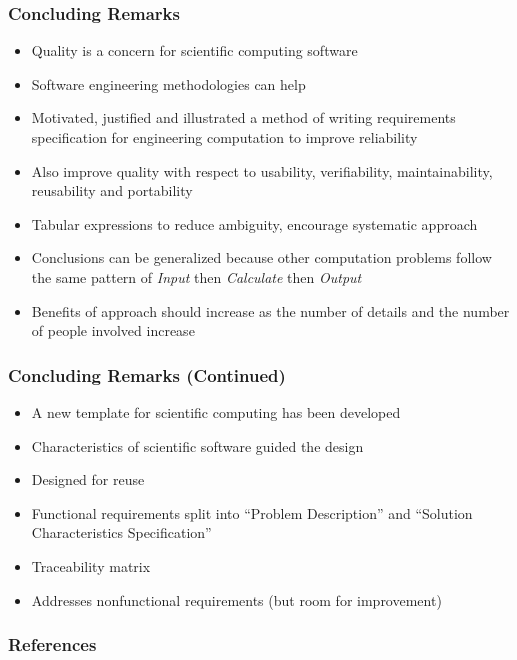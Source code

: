 \documentclass[t,12pt,numbers,fleqn]{beamer}
\begin{document}
\begin{frame}
\frametitle{Concluding Remarks}
\begin{itemize}
\item Quality is a concern for scientific computing software
\item Software engineering methodologies can help
\item Motivated, justified and illustrated a method of writing requirements specification for engineering computation
to improve reliability
\item Also improve quality with respect to usability, verifiability, maintainability, reusability and portability
\item Tabular expressions to reduce ambiguity, encourage systematic approach
\item Conclusions can be generalized because other computation problems follow the same pattern of \emph{Input} then
\emph{Calculate} then \emph{Output}
\item Benefits of approach should increase as the number of details and the number of people involved increase
\end{itemize}
\end{frame}


\begin{frame}
\frametitle{Concluding Remarks (Continued)}
\begin{itemize}
\item A new template for scientific computing has been developed
\item Characteristics of scientific software guided the design
\item Designed for reuse
\item Functional requirements split into ``Problem Description'' and ``Solution Characteristics Specification''
\item Traceability matrix
\item Addresses nonfunctional requirements (but room for improvement)
\end{itemize}

\end{frame}


\begin{frame}[allowframebreaks]
\frametitle{References}

\nocite{Lai2004, SmithEtAl2004, SmithAndLai2005, IEEE1998, IEEE2000,
  IEEE2000_ThayerAndDorfman, RobertsonAndRobertson1999Vol, DesharnaisEtAl2004,
  JanickiAndKhedri2001, GhezziEtAl2003, KreymanAndParnas2002,
  ParnasAndClements1986, Segal2007_Dagsthul, Segal2008, Segal2007, Segal2005, Dubois2002}



\end{frame}

\end{document}
